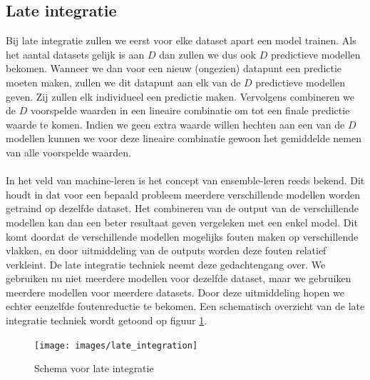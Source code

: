 \begin{abstract*}
\subsection{Late integratie}
\label{sec:D:integratie-laat}
Bij late integratie zullen we eerst voor elke dataset apart een model trainen. Als het aantal datasets gelijk is aan $D$ dan zullen we dus ook $D$ predictieve modellen bekomen. Wanneer we dan voor een nieuw (ongezien) datapunt een predictie moeten maken, zullen we dit datapunt aan elk van de $D$ predictieve modellen geven. Zij zullen elk individueel een predictie maken. Vervolgens combineren we de $D$ voorspelde waarden in een lineaire combinatie om tot een finale predictie waarde te komen. Indien we geen extra waarde willen hechten aan een van de $D$ modellen kunnen we voor deze lineaire combinatie gewoon het gemiddelde nemen van alle voorspelde waarden. \\ \\
In het veld van machine-leren is het concept van ensemble-leren reeds bekend. Dit houdt in dat voor een bepaald probleem meerdere verschillende modellen worden getraind op dezelfde dataset. Het combineren van de output van de verschillende modellen kan dan een beter resultaat geven vergeleken met een enkel model. Dit komt doordat de verschillende modellen mogelijks fouten maken op verschillende vlakken, en door uitmiddeling van de outputs worden deze fouten relatief verkleint. De late integratie techniek neemt deze gedachtengang over. We gebruiken nu niet meerdere modellen voor dezelfde dataset, maar we gebruiken meerdere modellen voor meerdere datasets. Door deze uitmiddeling hopen we echter eenzelfde foutenreductie te bekomen. Een schematisch overzicht van de late integratie techniek wordt getoond op figuur \ref{fig:D:integratie-laat}.
\begin{figure}
	\centering
	\texttt{[image: images/late\_integration]}
	\caption{Schema voor late integratie}
	\label{fig:D:integratie-laat}
\end{figure}


\end{abstract*}
